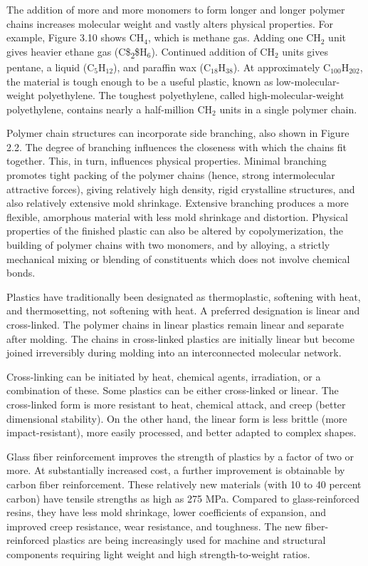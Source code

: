 \documentclass[a4paper,openany,nobib]{tufte-book}
\begin{document}
The addition of more and more monomers to form longer and longer polymer
chains increases molecular weight and vastly alters physical properties.
For example, Figure 3.10 shows \(\text{CH}_4\), which is methane gas.
Adding one \(\text{CH}_2\) unit gives heavier ethane gas (C\$\textsubscript{2}\$H\(_6\)).
Continued addition of \(\text{CH}_2\) units gives pentane, a liquid
(\(\text{C}_5\text{H}_{12}\)), and paraffin wax
(\(\text{C}_{18}\text{H}_{38}\)). At approximately
\(\text{C}_{100}\text{H}_{202}\), the material is tough enough to be a
useful plastic, known as low-molecular-weight polyethylene. The toughest
polyethylene, called high-molecular-weight polyethylene, contains nearly
a half-million \(\text{CH}_2\) units in a single polymer chain.

Polymer chain structures can incorporate side branching, also shown in
Figure 2.2. The degree of branching influences the closeness with which
the chains fit together. This, in turn, influences physical properties.
Minimal branching promotes tight packing of the polymer chains (hence,
strong intermolecular attractive forces), giving relatively high
density, rigid crystalline structures, and also relatively extensive
mold shrinkage. Extensive branching produces a more flexible, amorphous
material with less mold shrinkage and distortion. Physical properties of
the finished plastic can also be altered by copolymerization, the
building of polymer chains with two monomers, and by alloying, a
strictly mechanical mixing or blending of constituents which does not
involve chemical bonds.

Plastics have traditionally been designated as thermoplastic, softening
with heat, and thermosetting, not softening with heat. A preferred
designation is linear and cross-linked. The polymer chains in linear
plastics remain linear and separate after molding. The chains in
cross-linked plastics are initially linear but become joined
irreversibly during molding into an interconnected molecular network.

Cross-linking can be initiated by heat, chemical agents, irradiation, or
a combination of these. Some plastics can be either cross-linked or
linear. The cross-linked form is more resistant to heat, chemical
attack, and creep (better dimensional stability). On the other hand, the
linear form is less brittle (more impact-resistant), more easily
processed, and better adapted to complex shapes.

Glass fiber reinforcement improves the strength of plastics by a factor
of two or more. At substantially increased cost, a further improvement
is obtainable by carbon fiber reinforcement. These relatively new
materials (with 10 to 40 percent carbon) have tensile strengths as high
as 275 MPa. Compared to glass-reinforced resins, they have less mold
shrinkage, lower coefficients of expansion, and improved creep
resistance, wear resistance, and toughness. The new fiber-reinforced
plastics are being increasingly used for machine and structural
components requiring light weight and high strength-to-weight ratios.
\end{document}
